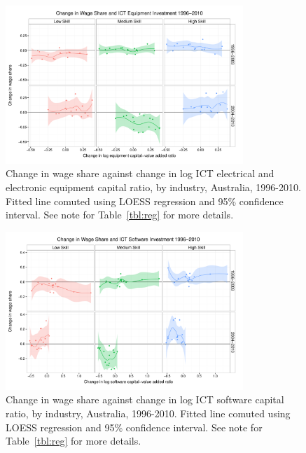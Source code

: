\begin{figure}
  \centering
\includegraphics[width=0.8\textwidth]{../figure/wage_share_equipment_skill_split.pdf}
  \caption{Change in wage share against change in log ICT electrical and electronic equipment capital ratio, by industry, Australia, 1996-2010.
    Fitted line comuted using LOESS regression and 95\% confidence interval. See note for Table~\ref{tbl:reg} for more details.
  }
  \label{fig:equip}
\end{figure}

\begin{figure}
  \centering
  \includegraphics[width=0.8\textwidth]{../figure/wage_share_software_skill_split.pdf}
  \caption{Change in wage share against change in log ICT software capital ratio, by industry, Australia, 1996-2010. Fitted line comuted using LOESS regression and 95\% confidence interval.
    See note for Table~\ref{tbl:reg} for more details.
  }
  \label{fig:soft}
\end{figure}

